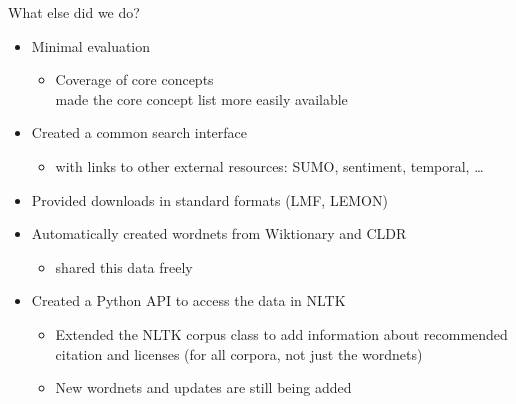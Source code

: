 \documentclass{beamer}
\begin{document}
\begin{frame}{What else did we do?}
  \begin{itemize}
  \item Minimal evaluation
    \begin{itemize}
    \item Coverage of core concepts
      \\ made the core concept list more easily available
    \end{itemize}
  \item Created a common search interface
    \begin{itemize}
    \item with links to other external resources: SUMO, sentiment, temporal, \ldots
    \end{itemize}
  \item Provided downloads in standard formats (LMF, LEMON)
  \item Automatically created wordnets from Wiktionary and CLDR
    \begin{itemize}
    \item shared this data freely 
    \end{itemize}
  \item Created a Python API to access the data in NLTK \citep{Bird:Klein:Loper:2009}
    \begin{itemize}
    \item Extended the NLTK corpus class to add information about recommended citation and licenses (for all corpora, not just the wordnets)
    \item New wordnets and updates are still being added
    \end{itemize}
  \end{itemize}

\end{frame}






\end{document}
